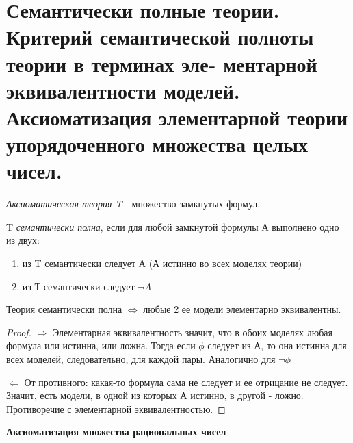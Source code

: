\documentclass{article}
\begin{document}
\setcounter{section}{26}
\section{Семантически полные теории. Критерий семантической полноты теории в терминах эле-
ментарной эквивалентности моделей. Аксиоматизация элементарной теории упорядоченного
множества целых чисел.}

\begin{definition}\textit{Аксиоматическая теория T} - множество замкнутых формул.
\end{definition}

T \textit{семантически полна}, если для любой замкнутой формулы А выполнено одно из двух:
\begin{enumerate}
    \item из T семантически следует А (А истинно во всех моделях теории)
    \item из Т семантически следует $\neg A$
\end{enumerate}

\begin{lemma}
Теория семантически полна $\Longleftrightarrow$ любые 2 ее модели элементарно эквивалентны.
\end{lemma}
\begin{proof}

$\Rightarrow$ Элементарная эквивалентность значит, что в обоих моделях любая формула или истинна, или ложна. Тогда если $\phi$ следует из А, то она истинна для всех моделей, следовательно, для каждой пары. Аналогично для $\neg \phi$

$\Leftarrow$ От противного: какая-то формула сама не следует и ее отрицание не следует. Значит, есть модели, в одной из которых А истинно, в другой - ложно. Противоречие с элементарной эквивалентностью.

\end{proof}

\noindent\textbf{Аксиоматизация множества рациональных чисел}
\vspace{2mm}
\end{document}
